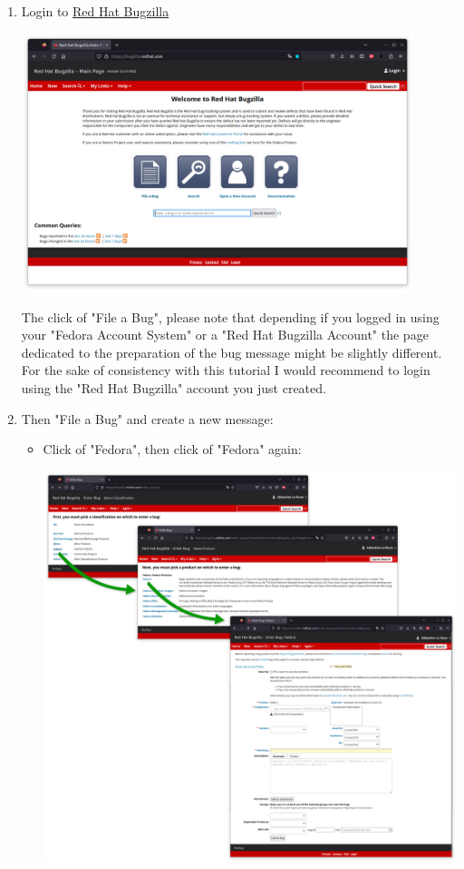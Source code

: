 \begin{enumerate}
\item Login to \href{https://bugzilla.redhat.com}{Red Hat Bugzilla}
\begin{center}
\includegraphics[width=0.9\textwidth,keepaspectratio=true,draft=\ddst]{img/rpms/bugzilla/bugzilla-0.eps}
\end{center}
The click of "File a Bug", please note that depending if you logged in using your "Fedora Account System" or a "Red Hat Bugzilla Account" the page dedicated to the preparation of the bug message might be slightly different. \\
For the sake of consistency with this tutorial I would recommend to login using the "Red Hat Bugzilla" account you just created. 
\item Then "File a Bug" and create a new message: 
\begin{itemize}
\item Click of "Fedora", then click of "Fedora" again:
\begin{center}
\hspace{-3.25cm}\includegraphics[width=1.05\textwidth,keepaspectratio=true,draft=\ddst]{img/rpms/bugzilla/bugzilla-4.eps}

\end{center}
\end{itemize}
\end{enumerate}
